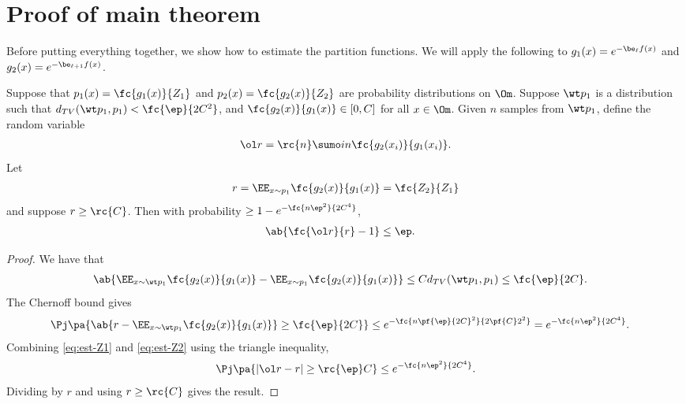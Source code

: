 \section{Proof of main theorem}

Before putting everything together, we show how to estimate the partition functions. 
We will apply the following to $g_1(x) = e^{-\be_{\ell}f(x)}$ and $g_2(x) = e^{-\be_{\ell+1} f(x)}$. 
\begin{lem}
Suppose that $p_1(x) =\fc{g_1(x)}{Z_1}$ and $p_2(x)=\fc{g_2(x)}{Z_2}$ are probability distributions on $\Om$. %
Suppose $\wt p_1$ is a distribution such that $d_{TV}(\wt p_1, p_1)<\fc{\ep}{2C^2}$, and $\fc{g_2(x)}{g_1(x)}\in [0, C]$ for all $x\in \Om$. Given $n$ samples from $\wt p_1$, define the random variable
\begin{align}
\ol r = \rc{n} \sumo in \fc{g_2(x_i)}{g_1(x_i)}.
\end{align}
Let
\begin{align}
r = \EE_{x\sim p_1}\fc{g_2(x)}{g_1(x)} = \fc{Z_2}{Z_1}
\end{align}
and suppose $r\ge \rc{C}$. 
Then  with probability $\ge 1-e^{-\fc{n\ep^2}{2C^4}}$, 
\begin{align}
\ab{\fc{\ol r}{r}-1}& \le \ep.
\end{align}
\label{l:partitionfunc}
\end{lem}
\begin{proof}
We have that 
\begin{align}
\label{eq:est-Z1}
\ab{\EE_{x\sim \wt p_1} \fc{g_2(x)}{g_1(x)} - \EE_{x\sim p_1}\fc{g_2(x)}{g_1(x)}}
&\le Cd_{TV}(\wt p_1, p_1)\le \fc{\ep}{2C}.
\end{align}
The Chernoff bound gives
\begin{align}
\Pj
\pa{
\ab{r - \EE_{x\sim \wt p_1} \fc{g_2(x)}{g_1(x)}} \ge \fc{\ep}{2C}
}
&\le 
e^{-\fc{n\pf{\ep}{2C}^2}{2\pf{C}2^2}} = 
e^{-\fc{n\ep^2}{2C^4}}.\label{eq:est-Z2}
\end{align}
Combining \eqref{eq:est-Z1} and \eqref{eq:est-Z2} using the triangle inequality,
\begin{align}
\Pj\pa{|\ol r- r|\ge \rc{\ep}C} \le e^{-\fc{n\ep^2}{2C^4}}.
\end{align}
Dividing by $r$ and using $r\ge \rc{C}$ gives the result.
\end{proof}


